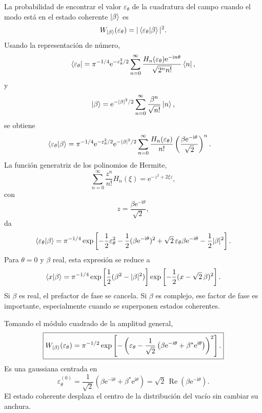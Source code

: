 \documentclass[11pt]{article}
\newcommand{\ii}{\mathrm{i}}
\newcommand{\ee}{\mathrm{e}}
\newcommand{\Real}{\operatorname{Re}}
\begin{document}
La probabilidad de encontrar el valor $\varepsilon_\theta$ de la cuadratura
del campo cuando el modo est\'a en el estado coherente $\ket\beta$ es
\begin{equation}
  W_{\ket\beta}(\varepsilon_\theta)
  =
  |\braket{\varepsilon_\theta|\beta}|^2.
\end{equation}
Usando la representaci\'on de n\'umero,
\begin{equation}
  \bra{\varepsilon_\theta}
  =
  \pi^{-1/4}\ee^{-\varepsilon_\theta^2/2}
  \sum_{n=0}^{\infty}
  \frac{H_n(\varepsilon_\theta)\ee^{-\ii n\theta}}
       {\sqrt{2^n n!}}\bra n,
\end{equation}
y
\begin{equation}
  \ket\beta
  =
  \ee^{-|\beta|^2/2}
  \sum_{n=0}^{\infty}\frac{\beta^n}{\sqrt{n!}}\ket n,
\end{equation}
se obtiene
\begin{align}
  \braket{\varepsilon_\theta|\beta}
  &=
  \pi^{-1/4}
  \ee^{-\varepsilon_\theta^2/2}
  \ee^{-|\beta|^2/2}
  \sum_{n=0}^{\infty}
  \frac{H_n(\varepsilon_\theta)}{n!}
  \left(\frac{\beta\ee^{-\ii\theta}}{\sqrt2}\right)^n.
\end{align}
La funci\'on generatriz de los polinomios de Hermite,
\begin{equation}
  \sum_{n=0}^{\infty}\frac{z^n}{n!}H_n(\xi)
  =
  \ee^{-z^2+2\xi z},
\end{equation}
con
\begin{equation}
  z=\frac{\beta\ee^{-\ii\theta}}{\sqrt2},
\end{equation}
da
\begin{equation}
  \braket{\varepsilon_\theta|\beta}
  =
  \pi^{-1/4}
  \exp\left[
  -\frac12\varepsilon_\theta^2
  -\frac12(\beta\ee^{-\ii\theta})^2
  +\sqrt2\,\varepsilon_\theta\beta\ee^{-\ii\theta}
  -\frac12|\beta|^2
  \right].
\end{equation}
Para $\theta=0$ y $\beta$ real, esta expresi\'on se reduce a
\begin{equation}
  \braket{x|\beta}
  =
  \pi^{-1/4}
  \exp\left[
  \frac12(\beta^2-|\beta|^2)
  \right]
  \exp\left[-\frac12(x-\sqrt2\,\beta)^2\right].
\end{equation}
Si $\beta$ es real, el prefactor de fase se cancela. Si $\beta$ es complejo,
ese factor de fase es importante, especialmente cuando se superponen estados
coherentes.

Tomando el m\'odulo cuadrado de la amplitud general,
\begin{equation}
  \boxed{
  W_{\ket\beta}(\varepsilon_\theta)
  =
  \pi^{-1/2}
  \exp\left[
  -\left(
  \varepsilon_\theta
  -
  \frac{1}{\sqrt2}
  \left(
  \beta\ee^{-\ii\theta}
  +
  \beta^*\ee^{\ii\theta}
  \right)
  \right)^2
  \right].
  }
\end{equation}
Es una gaussiana centrada en
\begin{equation}
  \varepsilon_\theta^{(0)}
  =
  \frac{1}{\sqrt2}
  \left(
  \beta\ee^{-\ii\theta}
  +
  \beta^*\ee^{\ii\theta}
  \right)
  =
  \sqrt2\,\Real(\beta\ee^{-\ii\theta}).
\end{equation}
El estado coherente desplaza el centro de la distribuci\'on del vac\'io sin
cambiar su anchura.
\end{document}

